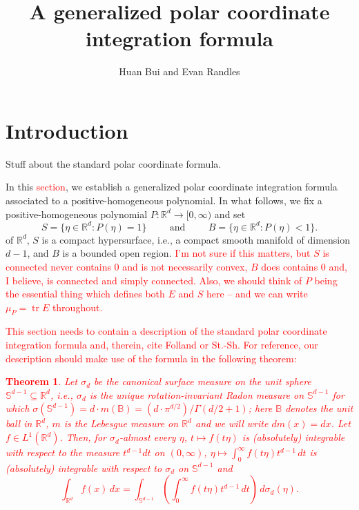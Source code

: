 \documentclass[11pt]{article}
\author{Huan Bui and Evan Randles}
\title{A generalized polar coordinate integration formula}
\date{}
\theoremstyle{theorem}
\newtheorem{theorem}{Theorem}[section]
\newcommand\tr{\operatorname{tr}}
\begin{document}
\maketitle


\section{Introduction}

Stuff about the standard polar coordinate formula.

In this \textcolor{red}{section}, we establish a generalized polar coordinate integration formula associated to a positive-homogeneous polynomial. In what follows, we fix a positive-homogeneous polynomial $P:\mathbb{R}^d\to [0,\infty)$ and set
\begin{equation*}
S=\{\eta\in\mathbb{R}^d:P(\eta)=1\}\hspace{1cm}\mbox{and}\hspace{1cm}B=\{\eta\in\mathbb{R}^d:P(\eta)<1\}. 
\end{equation*}
 of $\mathbb{R}^d$, $S$ is a compact hypersurface, i.e., a compact smooth manifold of dimension $d-1$, and $B$ is a bounded open region. \textcolor{red}{I'm not sure if this matters, but $S$ is connected never contains $0$ and is not necessarily convex, $B$ does contains $0$ and, I believe, is connected and simply connected. Also, we should think of $P$ being the essential thing which defines both $E$ and $S$ here -- and we can write $\mu_P=\tr E$ throughout. }

\textcolor{red}{This section needs to contain a description of the standard polar coordinate integration formula and, therein, cite Folland or St.-Sh. For reference, our description should make use of the formula in the following theorem:
\begin{theorem}
Let $\sigma_d$ be the canonical surface measure on the unit sphere $\mathbb{S}^{d-1}\subseteq \mathbb{R}^d$, i.e., $\sigma_d$ is the unique rotation-invariant Radon measure on $\mathbb{S}^{d-1}$ for which $\sigma(\mathbb{S}^{d-1})=d\cdot m(\mathbb{B})=(d\cdot\pi^{d/2})/\Gamma(d/2+1)$;  here $\mathbb{B}$ denotes the unit ball in $\mathbb{R}^d$, $m$ is the Lebesgue measure on $\mathbb{R}^d$ and we will write $dm(x)=dx$. Let $f\in L^1(\mathbb{R}^d)$. Then, for $\sigma_d$-almost every $\eta$, $t\mapsto f(t\eta)$ is (absolutely) integrable with respect to the measure $t^{d-1}dt$ on $(0,\infty)$, $\eta\mapsto \int_0^\infty f(t\eta)t^{d-1}\,dt$ is (absolutely) integrable with respect to $\sigma_d$ on $\mathbb{S}^{d-1}$ and
\begin{equation}\label{eq:StandardPolarIntegrationFormula}
\int_{\mathbb{R}^d}f(x)\,dx=\int_{\mathbb{S}^{d-1}}\left(\int_0^\infty f(t\eta)t^{d-1}\,dt\right)\,d\sigma_d(\eta).
\end{equation}
\end{theorem}}
\end{document}
